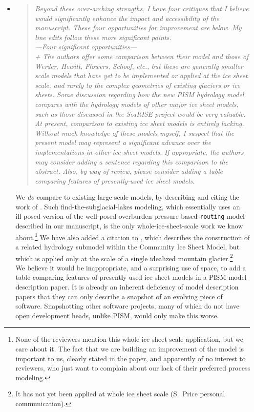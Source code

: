 \documentclass[11pt,reqno]{amsart}
\newcommand{\reply}[2]{
\medskip\medskip
\item  \begin{quote}
\emph{#1}
\end{quote}

\medskip
\noindent #2}
\begin{document}
\begin{itemize}
\reply{Beyond these over-arching strengths, I have four critiques that I believe would significantly enhance the impact and accessibility of the manuscript. These four opportunities for improvement are below. My line edits follow these more significant points.\\
---Four significant opportunities---\\
+ The authors offer some comparison between
their model and those of Werder, Hewitt, Flowers, Schoof, etc., but these are generally smaller scale models that have yet to be implemented or applied at the ice sheet
scale, and rarely to the complex geometries of existing glaciers or ice sheets. Some
discussion regarding how the new PISM hydrology model compares with the hydrology models of other major ice sheet models, such as those discussed in the SeaRISE
project would be very valuable.  At present, comparison to existing ice sheet models is
entirely lacking.  Without much knowledge of these models myself, I suspect that the
present model may represent a significant advance over the implementations in other
ice sheet models.  If appropriate, the authors may consider adding a sentence regarding this comparison to the abstract.  Also, by way of review, please consider adding a
table comparing features of presently-used ice sheet models.}
{We \emph{do} compare to existing large-scale models, by describing and citing the work of \cite{JohnsonFastook,LeBrocqetal2009,Siegertetal2009}.  Such find-the-subglacial-lakes modeling, which essentially uses an ill-posed version of the well-posed overburden-pressure-based \texttt{routing} model described in our manuscript, is the only whole-ice-sheet-scale work we know about.\footnote{None of the reviewers mention this whole ice sheet scale application, but we care about it.  The fact that we are building an improvement of the \cite{LeBrocqetal2009,Siegertetal2009} model is important to us, clearly stated in the paper, and apparently of no interest to reviewers, who just want to complain about our lack of their preferred process modeling.}  We have also added a citation to \cite{HoffmanPrice2014}, which describes the construction of a related hydrology submodel within the Community Ice Sheet Model, but which is applied only at the scale of a single idealized mountain glacier.\footnote{It has not yet been applied at whole ice sheet scale (S.~Price personal communication).}\\
\indent We believe it would be inappropriate, and a surprising use of space, to add a table comparing features of presently-used ice sheet models in a PISM model-description paper.  It is already an inherent deficiency of model description papers that they can only describe a snapshot of an evolving piece of software.  Snapshotting other software projects, many of which do not have open development heads, unlike PISM, would only make this worse.}


\end{itemize}
\end{document}
